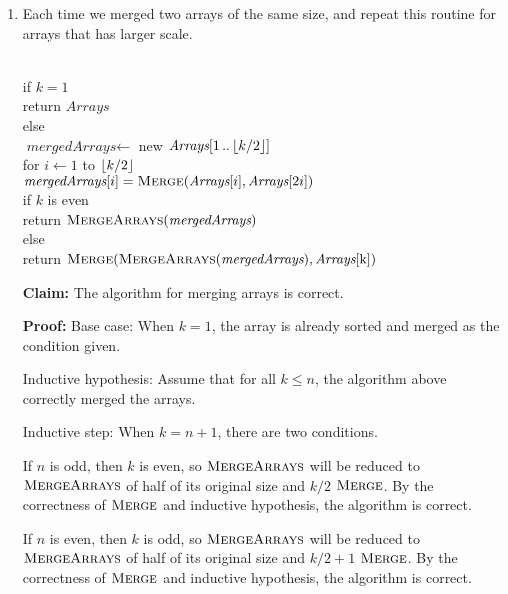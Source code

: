 \documentclass[11pt]{article}
\begin{document}
\begin{solution}
	\begin{enumerate}
		\item Each time we merged two arrays of the same size, and repeat this routine for arrays that has larger scale.
		
		\begin{center}
			\begin{algorithm}
				\+
				\\ if $\textit{k} = 1$\+
				\\ 	return $\textit{Arrays}$\-
				\\ else\+
				\\	$\textit{mergedArrays} \gets $ new $\textit{Arrays}[1\,..\,\lfloor k/2 \rfloor]$
				\\ for $i \gets 1$ to $\lfloor k / 2 \rfloor$\+
				\\		$\textit{mergedArrays}[i] = \textsc{Merge}(\textit{Arrays}[i], \textit{Arrays}[2i])$\-
				\\ if $\textit{k}$ is even\+
				\\ return $\textsc{MergeArrays}(\textit{mergedArrays})$\-
				\\ else\+
				\\ return $\textsc{Merge}(\textsc{MergeArrays}(\textit{mergedArrays}), \textit{Arrays}[\text{k}])$
			\end{algorithm}
		\end{center}
		
		\textbf{Claim:} The algorithm for merging arrays is correct.
		
		\textbf{Proof:} Base case: When $k = 1$, the array is already sorted and merged as the condition given.
		
			Inductive hypothesis: Assume that for all $k \leq n$, the algorithm above correctly merged the arrays.
			
			Inductive step: When $k = n + 1$, there are two conditions. 
			
			If $n$ is odd, then $k$ is even, so $\textsc{MergeArrays}$ will be reduced to $\textsc{MergeArrays}$ of half of its original size and $k / 2$ $\textsc{Merge}$. By the correctness of $\textsc{Merge}$ and inductive hypothesis, the algorithm is correct. 
			
			If $n$ is even, then $k$ is odd, so $\textsc{MergeArrays}$ will be reduced to $\textsc{MergeArrays}$ of half of its original size and $k / 2 + 1$ $\textsc{Merge}$. By the correctness of $\textsc{Merge}$ and inductive hypothesis, the algorithm is correct.
			

\end{enumerate}
\end{solution}
\end{document}
